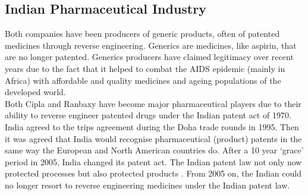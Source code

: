 \subsection{Indian Pharmaceutical Industry}
Both companies have been producers of generic \pharma products, often of patented medicines through reverse engineering.
Generics are medicines, like aspirin, that are no longer patented. 
Generics producers have claimed legitimacy over recent years due to the fact that 
it helped to combat the AIDS epidemic (mainly in Africa) with affordable and quality medicines and ageing populations of the developed world.\\ %
Both Cipla and Ranbaxy have become major pharmaceutical players due to their ability to reverse engineer patented drugs under the Indian patent act of 1970.
India agreed to the \gls{trips} agreement during the Doha trade rounds in 1995.
Then it was agreed that India would recognise pharmaceutical (product) patents in the same way the European and North American countries do.
After a 10 year `grace' period in 2005, India changed its patent act.
The Indian patent law not only now protected processes but also protected products .
From 2005 on, the Indian \pharma could no longer resort to reverse engineering medicines under the Indian patent law.

